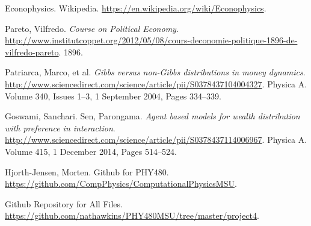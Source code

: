 \documentclass[11pt]{article}
\begin{document}
	\begin{thebibliography}{9}
		
		 Econophysics. Wikipedia. \url{https://en.wikipedia.org/wiki/Econophysics}.
		
		 Pareto, Vilfredo. \textit{Course on Political Economy}. \url{http://www.institutcoppet.org/2012/05/08/cours-deconomie-politique-1896-de-vilfredo-pareto}. 1896.
		
		 Patriarca, Marco, et al. \textit{Gibbs versus non-Gibbs distributions in money dynamics}. \url{http://www.sciencedirect.com/science/article/pii/S0378437104004327}. Physica A. Volume 340, Issues 1–3, 1 September 2004, Pages 334–339.
		
		 Goswami, Sanchari. Sen, Parongama. \textit{Agent based models for wealth distribution with preference in interaction}. \url{http://www.sciencedirect.com/science/article/pii/S0378437114006967}. Physica A. Volume 415, 1 December 2014, Pages 514–524.
		
		 Hjorth-Jensen, Morten. Github for PHY480. \url{https://github.com/CompPhysics/ComputationalPhysicsMSU}.
		
		 Github Repository for All Files. \url{https://github.com/nathawkins/PHY480MSU/tree/master/project4}.
		
	\end{thebibliography}
	
	
\end{document}
